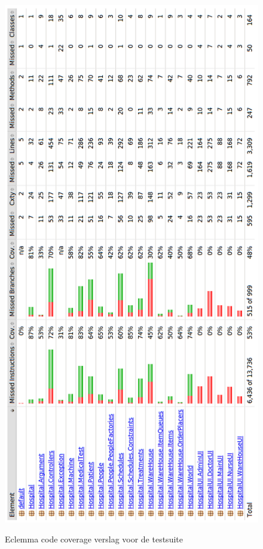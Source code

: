 \documentclass[a4paper]{article}
\begin{document}
\begin{figure}[h]
\centering
\caption{Eclemma code coverage verslag voor de testsuite}
\includegraphics[height=\textheight]{Pictures/Eclemma}
\label{fig:eclemma}
\end{figure}
\end{document}
